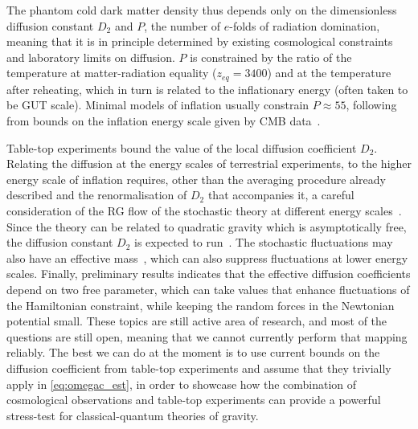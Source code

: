 \documentclass[amsmath,amssymb,11pt]{article}
\begin{document}
The phantom cold dark matter density thus depends only on the dimensionless diffusion constant $D_2$ and $P$, the number of $e$-folds of radiation domination, meaning that it is in principle determined by existing cosmological constraints and laboratory limits on diffusion.
$P$ is constrained by the ratio of the temperature at matter-radiation equality ($z_{eq}=3400$) and at the temperature after reheating, which in turn is related to the inflationary energy (often taken to be GUT scale). Minimal models of inflation usually constrain $P\approx 55$, following from bounds on the inflation energy scale given by CMB data~\cite{akrami2020planck}. 

Table-top experiments bound the value of the local diffusion coefficient $D_2$. Relating the diffusion at the energy scales of terrestrial experiments, to the higher energy scale of inflation requires, other than the averaging procedure already described and the renormalisation of $D_2$ that accompanies it, a careful consideration of the RG flow of the stochastic theory at different energy scales~\cite{grudka2024renormalisation}. Since the theory can be related to quadratic gravity which is asymptotically free, the diffusion constant $D_2$ is expected to run~\cite{julve1978quantum,fradkin1981renormalizable, benedetti2009asymptotic,buccio2024physical,grudka2024renormalisation}. The stochastic fluctuations may also have an effective mass~\cite{grudka2024renormalisation}, which can also suppress fluctuations at lower energy scales. Finally, preliminary results indicates that the effective diffusion coefficients depend on two free parameter, which can take values that enhance fluctuations of the Hamiltonian constraint, while keeping the random forces in the Newtonian potential small.  These topics are still active area of research, and most of the questions are still open, meaning that we cannot currently perform that mapping reliably. The best we can do at the moment is to use current bounds on the diffusion coefficient from table-top experiments and assume that they trivially apply in \eqref{eq:omegac_est}, in order to showcase how the combination of cosmological observations and table-top experiments can provide a powerful stress-test for classical-quantum theories of gravity.  
\end{document}
